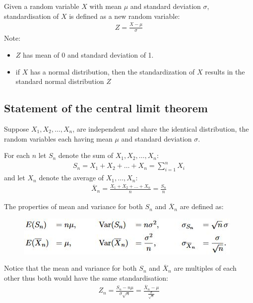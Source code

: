 \documentclass[10pt,a4paper]{article}
\begin{document}
Given a random variable $X$ with mean $\mu$ and standard deviation $\sigma$, standardisation of $X$
is defined as a new random variable: 
\begin{align*}
	Z = \frac{X-\mu}{\sigma}
\end{align*}
Note:
\begin{itemize}
	\item $Z$ has mean of 0 and standard deviation of 1.
	\item  if $X$ has a normal distribution, then the standardization of $X$ results in the standard normal
	distribution $Z$
\end{itemize}  

\subsection{Statement of the central limit theorem}

Suppose $X_1,X_2,\dots,X_n$, are independent and share the identical distribution, the random
variables each having mean $\mu$ and standard deviation $\sigma$. 

For each $n$ let $S_n$ denote the sum of $X_1,X_2,\dots,X_n$:
\begin{align*}
	S_n = X_1 + X_2 + \dots + X_n = \sum_{i=1}^n X_i 
\end{align*}
and let $X_n$ denote the average of $X_1,\dots,X_n$:
\begin{align*}
	\overline{X}_n = \frac{X_1 + X_2 + \dots + X_n}{n} = \frac{S_n}{n} 
\end{align*}

The properties of mean and variance for both $S_n$ and $\overline{X}_n$ are defined as:
\begin{figure} [h!]
	\centering
	\includegraphics[scale=0.9]{meanandvariance.JPG}
\end{figure}

Notice that the mean and variance for both $S_n$ and $\overline{X}_n$ are multiples of each other
thus both would have the same standardisation:
\begin{align*}
	Z_n = \frac{S_n - n\mu}{\sigma \sqrt{n}} = \frac{\overline{X}_n - \mu}{\frac{\sigma}{\sqrt{n}}}
\end{align*}
\end{document}
